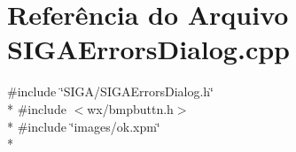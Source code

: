 \section{Referência do Arquivo S\+I\+G\+A\+Errors\+Dialog.\+cpp}
\label{_s_i_g_a_errors_dialog_8cpp}
{\ttfamily \#include \char`\"{}S\+I\+G\+A/\+S\+I\+G\+A\+Errors\+Dialog.\+h\char`\"{}}\\*
{\ttfamily \#include $<$wx/bmpbuttn.\+h$>$}\\*
{\ttfamily \#include \char`\"{}images/ok.\+xpm\char`\"{}}\\*
